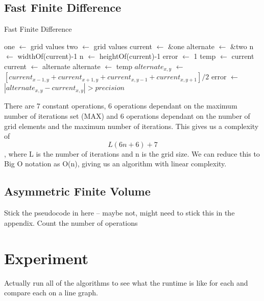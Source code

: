 \documentclass{article}
\newcommand*\Let[2]{\State #1 $\gets$ #2}
\begin{document}
\subsection{Fast Finite Difference}
\begin{algorithm}
    \caption{Fast Finite Difference}
    \label{alg:ffd}
    \begin{algorithmic}[1]
            \Let{one}{grid values}
            \Let{two}{grid values}
            \Let{*current}{\&one}
            \Let{*alternate}{\&two}
            \Let{n}{widthOf(current)-1}
            \Let{n}{heightOf(current)-1}
                \Let{error}{1}
                \Let{temp}{current}
                \Let{current}{alternate}
                \Let{alternate}{temp}
                            \Let{$alternate_{x,y}$}{$[{current_{x-1,y}+current_{x+1,y}+current_{x,y-1}+current_{x,y+1}}] / {2}$}
                        \EndIf
                            \Let{error}{$|alternate_{x,y} - current_{x,y}| > precision$}
                        \EndIf
                    \EndFor
                \EndFor
            \EndFor
        \EndFunction
    \end{algorithmic}
\end{algorithm}

There are 7 constant operations, 6 operations dependant on the maximum number of iterations set (MAX) and 6 operations dependant on the number of grid elements and the maximum number of iterations. This gives us a complexity of \[L(6n + 6) + 7\], where L is the number of iterations and n is the grid size. We can reduce this to Big O notation as O(n), giving us an algorithm with linear complexity.
\subsection{Asymmetric Finite Volume}
Stick the pseudocode in here -- maybe not, might need to stick this in the appendix.
Count the number of operations

\section{Experiment}

Actually run all of the algorithms to see what the runtime is like for each and compare each on a line graph. 
\end{document}
